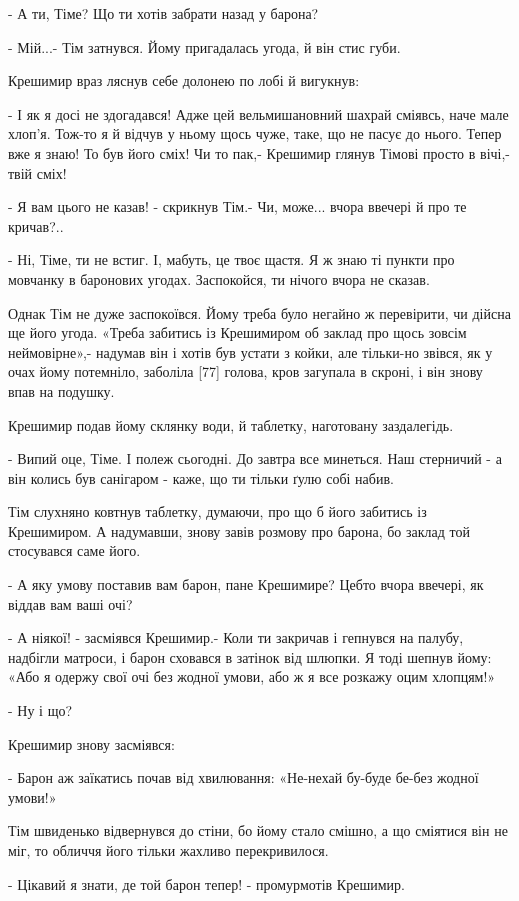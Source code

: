 - А ти, Тіме? Що ти хотів забрати назад у барона?

- Мій...- Тім затнувся. Йому пригадалась угода, й він стис губи.

Крешимир враз ляснув себе долонею по лобі й вигукнув:

- І як я досі не здогадався! Адже цей вельмишановний шахрай сміявсь, наче мале хлоп'я. Тож-то я й відчув у ньому щось чуже, таке, що не пасує до нього. Тепер вже я знаю! То був його сміх! Чи то пак,- Крешимир глянув Тімові просто в вічі,- твій сміх!

- Я вам цього не казав! - скрикнув Тім.- Чи, може... вчора ввечері й про те кричав?..

- Ні, Тіме, ти не встиг. І, мабуть, це твоє щастя. Я ж знаю ті пункти про мовчанку в баронових угодах. Заспокойся, ти нічого вчора не сказав.

Однак Тім не дуже заспокоївся. Йому треба було негайно ж перевірити, чи дійсна ще його угода. «Треба забитись із Крешимиром об заклад про щось зовсім неймовірне»,- надумав він і хотів був устати з койки, але тільки-но звівся, як у очах йому потемніло, заболіла [77] голова, кров загупала в скроні, і він знову впав на подушку.

Крешимир подав йому склянку води, й таблетку, наготовану заздалегідь.

- Випий оце, Тіме. І полеж сьогодні. До завтра все минеться. Наш стерничий - а він колись був санігаром - каже, що ти тільки ґулю собі набив.

Тім слухняно ковтнув таблетку, думаючи, про що б його забитись із Крешимиром. А надумавши, знову завів розмову про барона, бо заклад той стосувався саме його.

- А яку умову поставив вам барон, пане Крешимире? Цебто вчора ввечері, як віддав вам ваші очі?

- А ніякої! - засміявся Крешимир.- Коли ти закричав і гепнувся на палубу, надбігли матроси, і барон сховався в затінок від шлюпки. Я тоді шепнув йому: «Або я одержу свої очі без жодної умови, або ж я все розкажу оцим хлопцям!»

- Ну і що?

Крешимир знову засміявся:

- Барон аж заїкатись почав від хвилювання: «Не-нехай бу-буде бе-без жодної умови!»

Тім швиденько відвернувся до стіни, бо йому стало смішно, а що сміятися він не міг, то обличчя його тільки жахливо перекривилося.

- Цікавий я знати, де той барон тепер! - промурмотів Крешимир.

